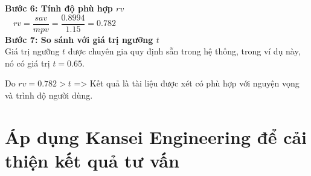 \textbf{Bước 6: Tính độ phù hợp $rv$}\\

$\>$$\>$$\>$ $rv = \dfrac{sav}{mpv} = \dfrac{0.8994}{1.15} = 0.782 $\\

\textbf{Bước 7: So sánh với giá trị ngưỡng $t$}\\

Giá trị ngưỡng $t$ được chuyên gia quy định sẵn trong hệ thống, trong ví dụ này, nó có giá trị $t = 0.65$.

Do $rv = 0.782 > t$ => Kết quả là tài liệu được xét có phù hợp với nguyện vọng và trình độ người dùng.
	
\section{Áp dụng Kansei Engineering để cải thiện kết quả tư vấn}